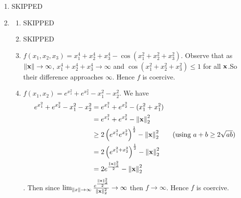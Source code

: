 \begin{enumerate}
\begin{enumerate}
\begin{align*}
                                                            & < 1
                    \end{align*}
                    since \(y, z \in \Omega \implies \norm{y}, \norm{z} < 1\) and \(\lambda \in [0, 1]\). Hence \(\Omega\) is convex.
              \item \(\Omega = \{\fx = (x_1, x_2) \in \bR^2: x_1^2 + x_2 \leq 1\} \cup \{\fx = (x_1, x_2) \in \bR^2: x_1 \geq 0, x_2 \geq 0\}\). Consider \(y = (-1, 0)\) and \(z = (0, 10)\) then \(y, z \in \Omega\). However the midpoint \((-\frac{1}{2}, 5) \notin \Omega\). Hence \(\Omega\) is not convex.
          \end{enumerate}
    \item {\color{red} SKIPPED}
    \item \begin{enumerate}[label=(\arabic*)]
              \item {\color{red} SKIPPED}
              \item {\color{red} SKIPPED}
              \item \(f(x_1, x_2, x_3) = x_1^4 + x_2^4 + x_3^4 - \cos(x_1^2 + x_2^2 + x_3^2)\). Observe that as \(\norm{\mathbf{x}} \to \infty\), \(x_1^4 + x_2^4 + x_3^4 \to \infty\) and \(\cos(x_1^2 + x_2^2 + x_3^2) \leq 1\) for all \(\mathbf{x}\).So their difference approaches \(\infty\). Hence \(f\) is coercive.
              \item \(f(x_1, x_2) = e^{x_1^2} + e^{x_2^2} - x_1^2 - x_2^2\). We have
                    \begin{align*}
                        e^{x_1^2} + e^{x_2^2} - x_1^2 - x_2^2 & = e^{x_1^2} + e^{x_2^2} - (x_1^2 + x_1^2)                                                                 \\
                                                              & = e^{x_1^2} + e^{x_2^2} - \norm{\fx}_2^2                                                                  \\
                                                              & \geq 2 \left(e^{x_1^2}e^{x_2^2}\right)^\frac{1}{2} - \norm{\fx}_2^2 \tag{using \(a + b \geq 2\sqrt{ab}\)} \\
                                                              & = 2\left(e^{x_1^2 + x_2^2}\right)^\frac{1}{2} - \norm{\fx}_2^2                                            \\
                                                              & = 2e^{\frac{\norm{\fx}_2^2}{2}} - \norm{\fx}_2^2
                    \end{align*}. Then since \(\lim_{\norm{x} \to \infty} \frac{e^{\frac{\norm{\mathbf{x}}_2^2}{2}}}{\norm{\mathbf{x}}_2^2} \to \infty\) then \(f \to \infty\). Hence \(f\) is coercive.

\end{enumerate}
\end{enumerate}
